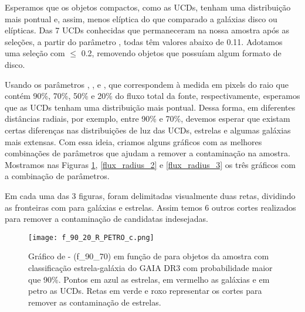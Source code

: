 \vspace{\baselineskip}

Esperamos que os objetos compactos, como as UCDs, tenham uma distribuição mais pontual e, assim, menos elíptica do que comparado a galáxias disco ou elípticas. Das 7 UCDs conhecidas que permaneceram na nossa amostra após as seleções, a partir do parâmetro , todas têm valores abaixo de 0.11. Adotamos uma seleção com  $\leq$ 0.2, removendo objetos que possuíam algum formato de disco.

\vspace{\baselineskip}

Usando os parâmetros , ,  e , que correspondem à medida em pixels do raio que contém 90\%, 70\%, 50\% e 20\% do fluxo total da fonte, respectivamente, esperamos que as UCDs tenham uma distribuição mais pontual. Dessa forma, em diferentes distâncias radiais, por exemplo, entre 90\% e 70\%, devemos esperar que existam certas diferenças nas distribuições de luz das UCDs, estrelas e algumas galáxias mais extensas. Com essa ideia, criamos alguns gráficos com as melhores combinações de parâmetros que ajudam a remover a contaminação na amostra. Mostramos nas Figuras \ref{flux_radius_1}, \ref{flux_radius_2} e \ref{flux_radius_3} os três gráficos com a combinação de parâmetros. 

Em cada uma das 3 figuras, foram delimitadas visualmente duas retas, dividindo as fronteiras com para galáxias e estrelas. Assim temos 6 outros cortes realizados para remover a contaminação de candidatas indesejadas.

\begin{figure}[!ht]
    \begin{center}
    \texttt{[image: f\_90\_20\_R\_PETRO\_c.png]}
    \caption{Gráfico de  -  (f\_90\_70) em função de  para objetos da amostra com classificação estrela-galáxia do GAIA DR3 com probabilidade maior que 90\%. Pontos em azul as estrelas, em vermelho as galáxias e em petro as UCDs. Retas em verde e roxo representar os cortes para remover as contaminação de estrelas.}
    \label{flux_radius_1}
    \end{center}
\end{figure}

\vspace{\baselineskip}

